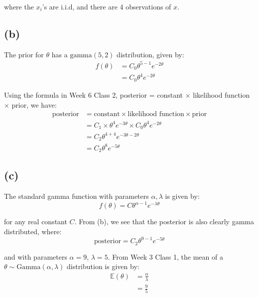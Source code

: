 \documentclass[12pt]{article}
\begin{document}
\noindent where the $x_i$'s are i.i.d, and there are 4 observations of $x$. 

\subsection*{(b)}

The prior for $\theta$ has a $\text{gamma}(5,2)$ distribution, given by: \begin{align*}
    f(\theta) &= C_{0} \theta^{5-1}e^{-2\theta} \\ 
    &= C_{0} \theta^{4}e^{-2\theta}
\end{align*}

\noindent Using the formula in Week 6 Class 2, posterior = constant $\times$ likelihood function $\times$ prior, we have: \begin{align*}
    \text{posterior} &= \text{constant} \times \text{likelihood function} \times \text{prior} \\ 
    &= C_{1} \times \theta^{4}e^{-3\theta} \times C_{0} \theta^{4}e^{-2\theta} \\ 
    &= C_{2} \theta^{4+4}e^{-3\theta - 2\theta} \\ 
    &= \boxed{C_{2} \theta^{8}e^{-5\theta}}
\end{align*}

\subsection*{(c)}

The standard gamma function with parameters $\alpha, \lambda$ is given by: \begin{equation*}
    f(\theta) = C \theta^{\alpha-1}e^{-\lambda \theta}
\end{equation*}

\noindent for any real constant $C$. From (b), we see that the posterior is also clearly gamma distributed, where: \begin{equation*}
    \text{posterior} = C_{2} \theta^{9-1} e^{-5\theta}
\end{equation*}

\noindent and with parameters $\alpha = 9$, $\lambda = 5$. From Week 3 Class 1, the mean of a $\theta \sim \text{Gamma}(\alpha, \lambda)$ distribution is given by: \begin{align*}
    \mathbb{E}(\theta) &= \frac{\alpha}{\lambda} \\ 
    &= \boxed{\frac{9}{5}}
\end{align*}
\end{document}
